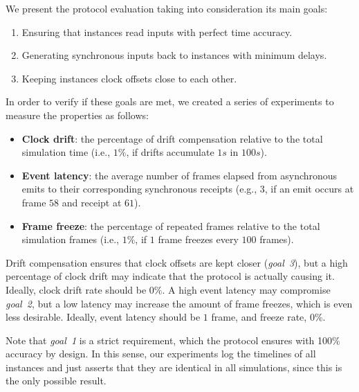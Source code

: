 \documentclass[sigplan,screen]{acmart}
\begin{document}
We present the protocol evaluation taking into consideration its main goals:
%
\begin{enumerate}
\item Ensuring that instances read inputs with perfect time accuracy.
\item Generating synchronous inputs back to instances with minimum delays.
\item Keeping instances clock offsets close to each other.
\end{enumerate}
%
In order to verify if these goals are met, we created a series of experiments
to measure the properties as follows:
%
\begin{itemize}
\item \textbf{Clock drift}:
    the percentage of drift compensation relative to the total simulation time
    (i.e., $1\%$, if drifts accumulate $1s$ in $100s$).
\item \textbf{Event latency}:
    the average number of frames elapsed from asynchronous emits to their
    corresponding synchronous receipts (e.g., $3$, if an emit occurs at frame
    $58$ and receipt at $61$).
\item \textbf{Frame freeze}:
    the percentage of repeated frames relative to the total simulation frames
    (i.e., $1\%$, if $1$ frame freezes every $100$ frames).

\end{itemize}
%
%
Drift compensation ensures that clock offsets are kept closer (\emph{goal~3}),
but a high percentage of clock drift may indicate that the protocol is actually
causing it.
Ideally, clock drift rate should be $0\%$.
%
A high event latency may compromise \emph{goal~2}, but a low latency may
increase the amount of frame freezes, which is even less desirable.
Ideally, event latency should be $1$ frame, and freeze rate, $0\%$.
%

%
Note that \emph{goal~1} is a strict requirement, which the protocol ensures
with 100\% accuracy by design.
In this sense, our experiments log the timelines of all instances and just
asserts that they are identical in all simulations, since this is the only
possible result.
\end{document}
